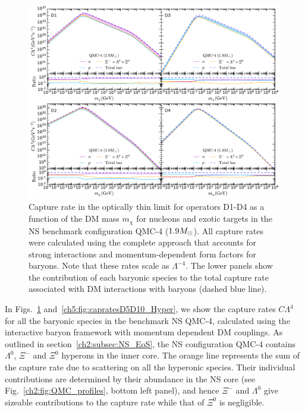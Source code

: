 \begin{figure}[t!bp] 
\centering
\includegraphics[width=\textwidth]{capture_3/D1_D4_C_mDM_hyper_meff_ratio.pdf}
\caption[Capture rate in the optically thin limit for operators D1-D4 as a function of the DM mass $m_\chi$ for nucleons and exotic targets in the NS benchmark configuration QMC-4 ($1.9\Msun$).]{Capture rate in the optically thin limit for operators D1-D4 as a function of the DM mass $m_\chi$ for nucleons and exotic targets in the NS benchmark configuration QMC-4 ($1.9\Msun$). All capture rates were calculated using the complete approach that accounts for strong interactions and momentum-dependent form factors for baryons. Note that these rates scale as $\Lambda^{-4}$. The lower panels show the contribution of each baryonic species to the total capture rate associated with DM interactions with baryons (dashed blue line). 
}
\label{ch5:fig:capratesD1D4_Hyper}
\end{figure}  



In Figs.~\ref{ch5:fig:capratesD1D4_Hyper} and~\ref{ch5:fig:capratesD5D10_Hyper}, we show the capture rates $C \Lambda^4$ for all the baryonic species in the benchmark NS QMC-4, calculated using the interactive baryon framework with momentum dependent DM couplings. As outlined in section~\ref{ch2:subsec:NS_EoS}, the NS configuration QMC-4 contains $\Lambda^0$, $\Xi^-$ and $\Xi^0$ hyperons in the inner core.  
The orange line represents the sum of the capture rate due to scattering on all the hyperonic species. Their individual contributions are determined by their abundance in the NS core (see Fig.~\ref{ch2:fig:QMC_profiles}, bottom left panel), and hence $\Xi^-$ and $\Lambda^0$ give sizeable contributions to the capture rate while that of $\Xi^0$ is negligible. 


